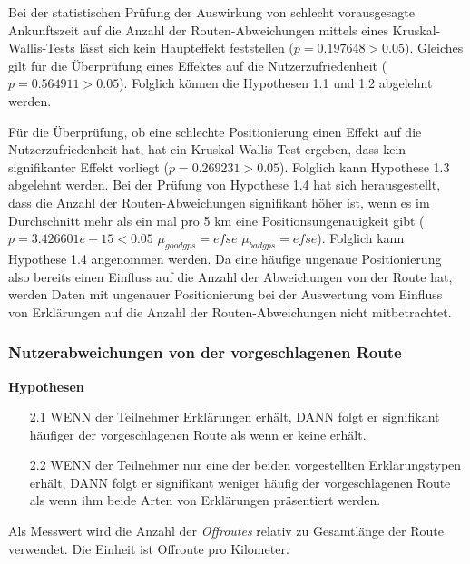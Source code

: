 Bei der statistischen Prüfung der Auswirkung von schlecht vorausgesagte Ankunftszeit auf die Anzahl der Routen-Abweichungen mittels eines Kruskal-Wallis-Tests lässt sich kein Haupteffekt feststellen ($ p = 0.197648 > 0.05 $). Gleiches gilt für die Überprüfung eines Effektes auf die Nutzerzufriedenheit ($ p = 0.564911 > 0.05 $). Folglich können die Hypothesen 1.1 und 1.2 abgelehnt werden.

Für die Überprüfung, ob eine schlechte Positionierung einen Effekt auf die Nutzerzufriedenheit hat, hat ein Kruskal-Wallis-Test ergeben, dass kein signifikanter Effekt vorliegt ($ p = 0.269231 > 0.05 $). Folglich kann Hypothese 1.3 abgelehnt werden. Bei der Prüfung von Hypothese 1.4 hat sich herausgestellt, dass die Anzahl der Routen-Abweichungen signifikant höher ist, wenn es im Durchschnitt mehr als ein mal pro 5 km eine Positionsungenauigkeit gibt ($ p = 3.426601e-15 < 0.05 $  $ \mu_{good gps}=efse $ $ \mu_{bad gps}=efse $). Folglich kann Hypothese 1.4 angenommen werden. Da eine häufige ungenaue Positionierung also bereits einen Einfluss auf die Anzahl der Abweichungen von der Route hat, werden Daten mit ungenauer Positionierung bei der Auswertung vom Einfluss von Erklärungen auf die Anzahl der Routen-Abweichungen nicht mitbetrachtet.

\subsubsection{Nutzerabweichungen von der vorgeschlagenen Route}

\textbf{Hypothesen}

\begin{enumerate}
    \item[2.1] WENN der Teilnehmer Erklärungen erhält, DANN folgt er signifikant häufiger der vorgeschlagenen Route als wenn er keine erhält.
    \item[2.2] WENN der Teilnehmer nur eine der beiden vorgestellten Erklärungstypen erhält, DANN folgt er signifikant weniger häufig der vorgeschlagenen Route als wenn ihm beide Arten von Erklärungen präsentiert werden.
\end{enumerate}

 Als Messwert wird die Anzahl der \textit{Offroutes} relativ zu Gesamtlänge der Route verwendet. Die Einheit ist Offroute pro Kilometer.

\smallskip

